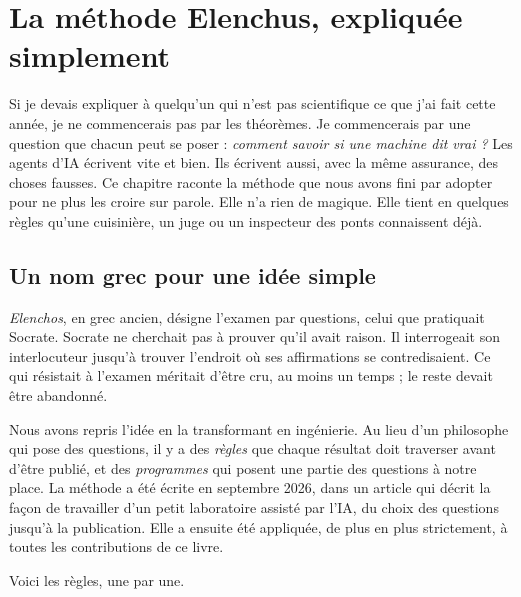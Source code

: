 \xdef\labelcourant{ch:elenchus}
\chapter{La méthode Elenchus, expliquée simplement}

Si je devais expliquer à quelqu'un qui n'est pas scientifique ce que j'ai fait cette année, je ne commencerais pas par
les théorèmes. Je commencerais par une question que chacun peut se poser : \emph{comment savoir si une machine dit
vrai ?} Les agents
d'IA écrivent vite et bien. Ils écrivent aussi, avec la même assurance, des choses fausses. Ce chapitre raconte la
méthode que nous avons fini par adopter pour ne plus les croire sur parole. Elle n'a rien de magique. Elle tient en
quelques règles qu'une cuisinière, un juge ou un inspecteur des ponts connaissent déjà.

\section{Un nom grec pour une idée simple}

\emph{Elenchos}, en grec ancien, désigne l'examen par questions, celui que pratiquait Socrate. Socrate ne cherchait pas
à prouver qu'il avait raison. Il interrogeait son interlocuteur jusqu'à trouver l'endroit où ses affirmations se
contredisaient. Ce qui résistait à l'examen méritait d'être cru, au moins un temps ; le reste devait être abandonné.

Nous avons repris l'idée en la transformant en ingénierie. Au lieu d'un philosophe qui pose des questions, il y a des
\emph{règles} que chaque résultat doit traverser avant d'être publié, et des \emph{programmes} qui posent une partie des
questions à notre place. La méthode a été écrite en septembre 2026, dans un article qui décrit la façon de travailler
d'un petit laboratoire assisté par l'IA, du choix des questions jusqu'à la publication. Elle a ensuite été appliquée, de plus en plus
strictement, à toutes les contributions de ce livre.

Voici les règles, une par une.


